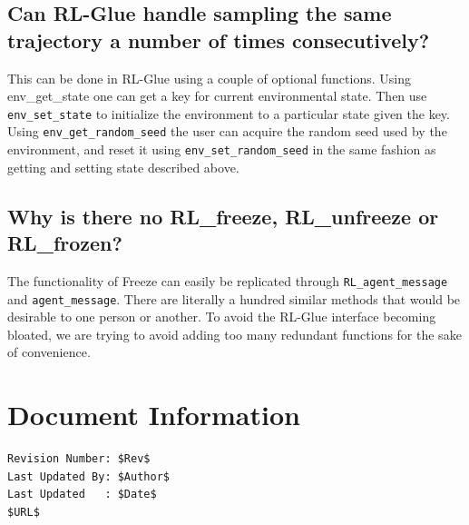 \documentclass[11pt]{article}
\begin{document}
\subsection{Can RL-Glue handle sampling the same trajectory a number of times consecutively?}
This can be done in RL-Glue using a couple of optional functions. Using env\_get\_state one can get a key for current environmental state. Then use \texttt{env\_set\_state} to initialize the environment to a particular state  given the key. Using \texttt{env\_get\_random\_seed} the user can acquire the random seed used by the environment, and reset it using \texttt{env\_set\_random\_seed} in the same fashion as getting and setting state described above. 

\subsection{Why is there no RL\_freeze, RL\_unfreeze or RL\_frozen?}
The functionality of Freeze can easily be replicated through \texttt{RL\_agent\_message} and \texttt{agent\_message}.  There are literally a hundred similar methods that would 
be desirable to one person or another. To avoid the RL-Glue interface becoming bloated, we are trying to avoid adding too many redundant functions for the sake of convenience.


\section*{Document Information}
\begin{verbatim}
Revision Number: $Rev$
Last Updated By: $Author$
Last Updated   : $Date$
$URL$
\end{verbatim}
\end{document}
